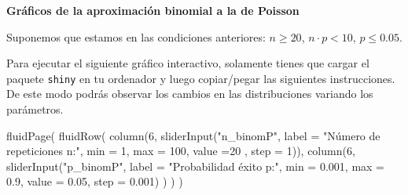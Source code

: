 \documentclass[
  letterpaper,
  DIV=11,
  numbers=noendperiod]{scrreprt}
\newenvironment{Shaded}{\begin{snugshade}}{\end{snugshade}}
\newcommand{\AttributeTok}[1]{\textcolor[rgb]{0.40,0.45,0.13}{#1}}
\newcommand{\DecValTok}[1]{\textcolor[rgb]{0.68,0.00,0.00}{#1}}
\newcommand{\FloatTok}[1]{\textcolor[rgb]{0.68,0.00,0.00}{#1}}
\newcommand{\FunctionTok}[1]{\textcolor[rgb]{0.28,0.35,0.67}{#1}}
\newcommand{\NormalTok}[1]{\textcolor[rgb]{0.00,0.23,0.31}{#1}}
\newcommand{\StringTok}[1]{\textcolor[rgb]{0.13,0.47,0.30}{#1}}
\begin{document}
\textbf{Gráficos de la aproximación binomial a la de Poisson}

Suponemos que estamos en las condiciones anteriores: \(n\geq 20\),
\(n\cdot p < 10\), \(p\leq 0.05\).

Para ejecutar el siguiente gráfico interactivo, solamente tienes que
cargar el paquete \texttt{shiny} en tu ordenador y luego copiar/pegar
las siguientes instrucciones. De este modo podrás observar los cambios
en las distribuciones variando los parámetros.

\begin{Shaded}
\begin{Highlighting}[]
\FunctionTok{fluidPage}\NormalTok{(}
\FunctionTok{fluidRow}\NormalTok{(}
  \FunctionTok{column}\NormalTok{(}\DecValTok{6}\NormalTok{,}
         \FunctionTok{sliderInput}\NormalTok{(}\StringTok{"n\_binomP"}\NormalTok{, }\AttributeTok{label =} \StringTok{"Número de repeticiones n:"}\NormalTok{,}
              \AttributeTok{min =} \DecValTok{1}\NormalTok{, }\AttributeTok{max =} \DecValTok{100}\NormalTok{, }\AttributeTok{value =}\DecValTok{20}\NormalTok{ , }\AttributeTok{step =} \DecValTok{1}\NormalTok{)),}
  \FunctionTok{column}\NormalTok{(}\DecValTok{6}\NormalTok{,}
          \FunctionTok{sliderInput}\NormalTok{(}\StringTok{"p\_binomP"}\NormalTok{, }\AttributeTok{label =} \StringTok{"Probabilidad éxito p:"}\NormalTok{,}
                     \AttributeTok{min =} \FloatTok{0.001}\NormalTok{, }\AttributeTok{max =} \FloatTok{0.9}\NormalTok{, }\AttributeTok{value =} \FloatTok{0.05}\NormalTok{, }\AttributeTok{step =} \FloatTok{0.001}\NormalTok{)}
\NormalTok{         )}
\NormalTok{  )}
\NormalTok{)}


\end{Highlighting}
\end{Shaded}
\end{document}
